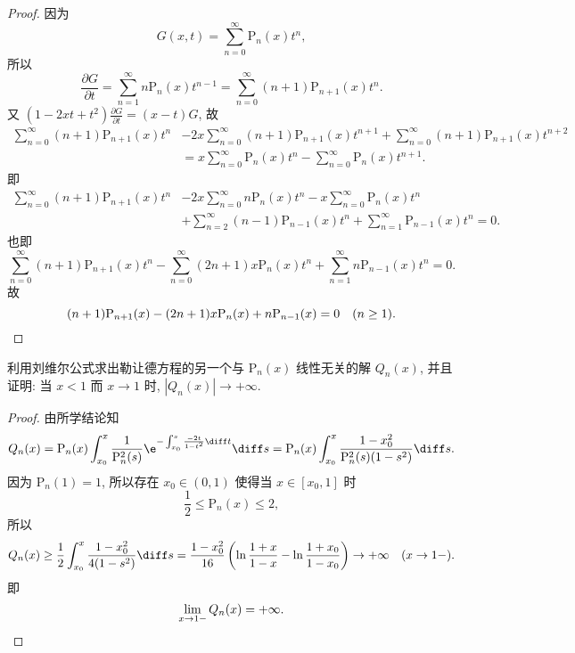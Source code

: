 \begin{proof} 
  因为
  \[G(x,t)=\sum_{n=0}^{\infty}\mathrm{P}_n(x)t^n,\]
  所以
  \[\frac{\partial G}{\partial t}
    = \sum_{n=1}^{\infty}n\mathrm{P}_n(x)t^{n-1}
    = \sum_{n=0}^{\infty}(n+1)\mathrm{P}_{n+1}(x)t^n.\]
  又 $(1-2xt+t^2)\frac{\partial G}{\partial t}=(x-t)G$, 故
  \begin{align*}
    \sum_{n=0}^{\infty}(n+1)\mathrm{P}_{n+1}(x)t^n
    & - 2x\sum_{n=0}^{\infty}(n+1)\mathrm{P}_{n+1}(x)t^{n+1}
    + \sum_{n=0}^{\infty}(n+1)\mathrm{P}_{n+1}(x)t^{n+2} \\
    & = x\sum_{n=0}^{\infty}\mathrm{P}_n(x)t^n-\sum_{n=0}^{\infty}\mathrm{P}_n(x)t^{n+1}.
  \end{align*}
  即
  \begin{align*}
    \sum_{n=0}^{\infty}(n+1)\mathrm{P}_{n+1}(x)t^n
    & -2x\sum_{n=0}^{\infty}n\mathrm{P}_n(x)t^n
    - x\sum_{n=0}^{\infty}\mathrm{P}_n(x)t^n \\
    & + \sum_{n=2}^{\infty}(n-1)\mathrm{P}_{n-1}(x)t^n
    + \sum_{n=1}^{\infty}\mathrm{P}_{n-1}(x)t^n=0.
  \end{align*}
  也即
  \[\sum_{n=0}^{\infty}(n+1)\mathrm{P}_{n+1}(x)t^n
    - \sum_{n=0}^{\infty}(2n+1)x\mathrm{P}_n(x)t^n
    + \sum_{n=1}^{\infty}n\mathrm{P}_{n-1}(x)t^n=0.\]
  故
  \[(n+1)\mathrm{P}_{n+1}(x)-(2n+1)x\mathrm{P}_n(x)+n\mathrm{P}_{n-1}(x)=0\quad (n\geq1 ).\qedhere\]
\end{proof}



\begin{exercise}
  利用刘维尔公式求出勒让德方程的另一个与 $\mathrm{P}_n(x)$ 线性无关的解 $Q_n(x)$,
  并且证明: 当 $x<1$ 而 $x\to1$ 时, $|Q_n(x)|\to+\infty$.
\end{exercise}

\begin{proof} 
  由所学结论知
  \[Q_n(x)
    = \mathrm{P}_n(x)\int_{x_0}^x\frac{1}{\mathrm{P}_n^2(s)}\e^{-\int_{x_0}^s\frac{-2t}{1-t^2}\diff t}\diff s
    = \mathrm{P}_n(x)\int_{x_0}^x\frac{1-x_0^2}{\mathrm{P}_n^2(s)(1-s^2)}\diff s.\]
  因为 $\mathrm{P}_n(1)=1$, 所以存在 $x_0\in (0,1)$ 使得当 $x\in[x_0,1]$ 时
  \[\frac{1}{2}\leq\mathrm{P}_n(x)\leq 2,\]
  所以
  \[Q_n(x)\geq\frac{1}{2}\int_{x_0}^x\frac{1-x_0^2}{4(1-s^2)}\diff s
    = \frac{1-x_0^2}{16}\left(\ln\frac{1+x}{1-x}-\ln\frac{1+x_0}{1-x_0}\right)\to+\infty
    \quad (x\to 1-).\]
  即
  \[\lim_{x\to1-}Q_n(x)=+\infty.\qedhere\]
\end{proof}



